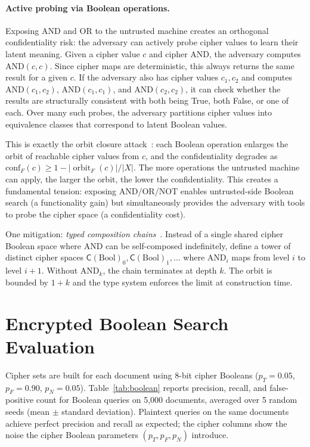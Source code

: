 \documentclass[conference]{IEEEtran}
\theoremstyle{definition}
\theoremstyle{plain}
\theoremstyle{remark}
\newcommand{\cipher}[1]{\mathsf{C}(#1)}
\DeclareMathOperator{\orbitF}{orbit}
\begin{document}
\paragraph{Active probing via Boolean operations.}
Exposing AND and OR to the untrusted machine creates an orthogonal
confidentiality risk: the adversary can actively probe cipher values to
learn their latent meaning.
Given a cipher value $c$ and cipher AND, the adversary computes
$\mathrm{AND}(c, c)$.
Since cipher maps are deterministic, this always returns the same result
for a given $c$.
If the adversary also has cipher values $c_1, c_2$ and computes
$\mathrm{AND}(c_1, c_2)$, $\mathrm{AND}(c_1, c_1)$, and
$\mathrm{AND}(c_2, c_2)$, it can check whether the results are
structurally consistent with both being True, both False, or one of each.
Over many such probes, the adversary partitions cipher values into
equivalence classes that correspond to latent Boolean values.

This is exactly the orbit closure
attack~\cite[Sec.~5]{towell2026algebraic}: each Boolean operation
enlarges the orbit of reachable cipher values from $c$, and the
confidentiality degrades as
$\mathrm{conf}_F(c) \geq 1 - |\orbitF_F(c)|/|X|$.
The more operations the untrusted machine can apply, the larger the
orbit, the lower the confidentiality.
This creates a fundamental tension: exposing AND/OR/NOT enables
untrusted-side Boolean search (a functionality gain) but simultaneously
provides the adversary with tools to probe the cipher space
(a confidentiality cost).

One mitigation: \emph{typed composition chains}~\cite[Sec.~5.5]{towell2026algebraic}.
Instead of a single shared cipher Boolean space where AND can be
self-composed indefinitely, define a tower of distinct cipher spaces
$\cipher{\mathrm{Bool}}_0, \cipher{\mathrm{Bool}}_1, \ldots$
where $\mathrm{AND}_i$ maps from level $i$ to level $i+1$.
Without $\mathrm{AND}_{k}$, the chain terminates at depth $k$.
The orbit is bounded by $1 + k$ and the type system enforces the
limit at construction time.


\section{Encrypted Boolean Search Evaluation}
\label{app:boolsearch}

Cipher sets are built for each document using 8-bit cipher Booleans
($p_T = 0.05$, $p_F = 0.90$, $p_N = 0.05$).  Table~\ref{tab:boolean}
reports precision, recall, and false-positive count for Boolean
queries on 5,000 documents, averaged over 5 random seeds (mean
$\pm$ standard deviation).  Plaintext queries on the same documents
achieve perfect precision and recall as expected; the cipher
columns show the noise the cipher Boolean parameters
$(p_T, p_F, p_N)$ introduce.
\end{document}
